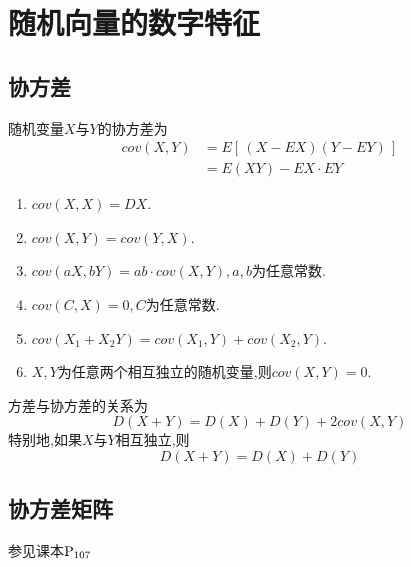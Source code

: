 \section{随机向量的数字特征}
\subsection{协方差}
随机变量$X$与$Y$的协方差为
\begin{equation}
\begin{split}
cov(X,Y)&=E[\,(X-EX)(Y-EY)\,]\\
&=E(XY)-EX\cdot EY
\end{split}
\end{equation}

\noindent \dya[协方差的性质]
\begin{enumerate}[1.]
	\setlength{\itemindent}{2em}
	\setlength{\topsep}{0.01em}
	\setlength{\itemsep}{0.01em}
	\item $cov(X,X)=DX$.
	\item $cov(X,Y)=cov(Y,X)$.
	\item $cov(aX,bY)=ab\cdot cov(X,Y),a,b$为任意常数.
	\item $cov(C,X)=0,C$为任意常数.
	\item $cov(X_1+X_2Y)=cov(X_1,Y)+cov(X_2,Y)$.
	\item $X,Y$为任意两个相互独立的随机变量,则$cov(X,Y)=0$.
\end{enumerate}

\theorem[方差与协方差]
方差与协方差的关系为
\begin{equation}
D(X+Y)=D(X)+D(Y)+2cov(X,Y)
\end{equation}
特别地,如果$X$与$Y$相互独立,则
\begin{equation}
D(X+Y)=D(X)+D(Y)
\end{equation}

\subsection{协方差矩阵}
参见课本$\rm{P}_{107}$\jg\jg

